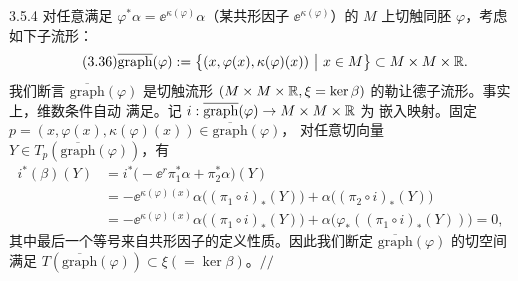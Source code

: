 \begin{wexam}{3.5.4}
对任意满足 $\varphi^*\alpha=\ee^{\kappa(\varphi)}\alpha$（某共形因子
$\ee^{\kappa(\varphi)}$）的 $M$ 上切触同胚 $\varphi$，考虑如下子流形：
\begin{equation}\tag{3.36}
  \overline{\mathrm{graph}}(\varphi)
  :=\bigl\{(x,\varphi(x),\kappa(\varphi)(x))\ \big|\ x\in M\bigr\}
  \subset M\times M\times\mathbb{R} .
\end{equation}
我们断言 $\overline{\mathrm{graph}}(\varphi)$ 是切触流形
$(M\times M\times\mathbb{R},\xi=\ker\beta)$ 的勒让德子流形。事实上，维数条件自动
满足。记 $i:\overline{\mathrm{graph}}(\varphi)\to M\times M\times\mathbb{R}$ 为
嵌入映射。固定
$p=(x,\varphi(x),\kappa(\varphi)(x))\in\overline{\mathrm{graph}}(\varphi)$，
对任意切向量
$Y\in T_p(\overline{\mathrm{graph}}(\varphi))$，有
\begin{align*}
  i^*(\beta)(Y)
  &=i^*\bigl(-\ee^r\pi_1^*\alpha+\pi_2^*\alpha\bigr)(Y)\\
  &=-\ee^{\kappa(\varphi)(x)}\alpha\bigl((\pi_1\circ i)_*(Y)\bigr)
   +\alpha\bigl((\pi_2\circ i)_*(Y)\bigr)\\
  &=-\ee^{\kappa(\varphi)(x)}\alpha\bigl((\pi_1\circ i)_*(Y)\bigr)
   +\alpha\bigl(\varphi_*((\pi_1\circ i)_*(Y))\bigr)=0,
\end{align*}
其中最后一个等号来自共形因子的定义性质。因此我们断定
$\overline{\mathrm{graph}}(\varphi)$ 的切空间满足
$T(\overline{\mathrm{graph}}(\varphi))\subset\xi(=\ker\beta)$。\hfill$//$
\end{wexam}

